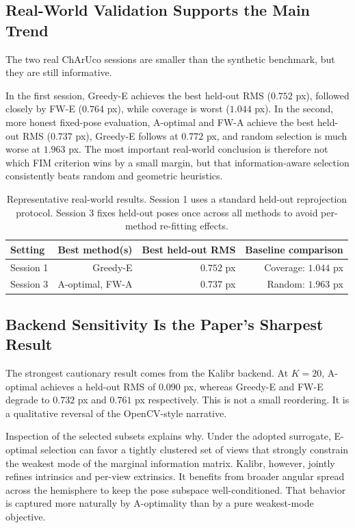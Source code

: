 \documentclass[11pt]{article}
\begin{document}
\subsection{Real-World Validation Supports the Main Trend}
The two real ChArUco sessions are smaller than the synthetic benchmark, but
they are still informative.

In the first session, Greedy-E achieves the best held-out RMS ($0.752$ px),
followed closely by FW-E ($0.764$ px), while coverage is worst ($1.044$ px).
In the second, more honest fixed-pose evaluation, A-optimal and FW-A achieve
the best held-out RMS ($0.737$ px), Greedy-E follows at $0.772$ px, and random
selection is much worse at $1.963$ px. The most important real-world conclusion
is therefore not which FIM criterion wins by a small margin, but that
information-aware selection consistently beats random and geometric heuristics.

\begin{table}[ht]
\centering
\small
\caption{Representative real-world results.
Session 1 uses a standard held-out reprojection protocol.
Session 3 fixes held-out poses once across all methods to avoid per-method
re-fitting effects.}
\label{tab:real_world_summary}
\setlength{\tabcolsep}{5pt}
\begin{tabular}{lrrr}
\toprule
Setting & Best method(s) & Best held-out RMS & Baseline comparison \\
\midrule
Session 1 & Greedy-E & $0.752$ px & Coverage: $1.044$ px \\
Session 3 & A-optimal, FW-A & $0.737$ px & Random: $1.963$ px \\
\bottomrule
\end{tabular}
\end{table}

\subsection{Backend Sensitivity Is the Paper's Sharpest Result}
The strongest cautionary result comes from the Kalibr backend. At
$K=20$, A-optimal achieves a held-out RMS of $0.090$ px, whereas Greedy-E and
FW-E degrade to $0.732$ px and $0.761$ px respectively. This is not a small
reordering. It is a qualitative reversal of the OpenCV-style narrative.

Inspection of the selected subsets explains why. Under the adopted surrogate,
E-optimal selection can favor a tightly clustered set of views that strongly
constrain the weakest mode of the marginal information matrix. Kalibr, however,
jointly refines intrinsics and per-view extrinsics. It benefits from broader
angular spread across the hemisphere to keep the pose subspace well-conditioned.
That behavior is captured more naturally by A-optimality than by a pure
weakest-mode objective.
\end{document}
